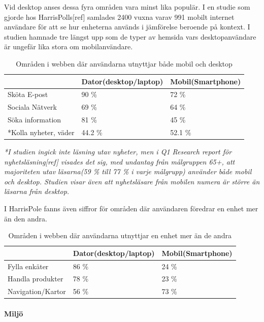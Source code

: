 \documentclass[11pt]{article}
\begin{document}
Vid desktop anses dessa fyra områden vara minst lika populär. I en studie som gjorde hos HarrisPolls[ref] samlades 2400 vuxna varav 991 mobilt internet användare för att se hur enheterna används i jämförelse beroende på kontext. I studien hamnade tre längst upp som de typer av hemsida vars desktopanvändare är ungefär lika stora om mobilanvändare.
\\
\begin{table}[H]
	\centering
	\begin{tabular}{|p{4cm}|p{4cm}|p{4cm}|}
	\hline
	~&Dator(desktop/laptop)&Mobil(Smartphone)\\ \hline
	Sköta E-post &90 \%&72 \%\\ \hline
	Sociala Nätverk&69 \%&64 \%\\ \hline
	Söka information&81 \%&45 \%\\ \hline
	*Kolla nyheter, väder&44.2 \%&52.1 \%\\ \hline
	\end{tabular}
    \caption {Områden i webben där användarna utnyttjar både mobil och desktop}
\end{table}
\textit{*I studien ingick inte läsning utav nyheter, men i Q1 Research report för nyhetsläsning[ref] visades det sig, med undantag från målgruppen 65+, att majoriteten utav läsarna(59 \% till 77 \% i varje målgrupp) använder både mobil och desktop. Studien visar även att nyhetsläsare från mobilen numera är större än läsarna från desktop.}

I HarrisPole fanns även siffror för områden där användaren föredrar en enhet mer än den andra.

\begin{table}[H]
	\centering
	\begin{tabular}{|p{4cm}|p{4cm}|p{4cm}|}
	\hline
	~&Dator(desktop/laptop)&Mobil(Smartphone)\\ \hline
	Fylla enkäter &86 \%&24 \%\\ \hline
	Handla produkter&78 \%&23 \%\\ \hline
	Navigation/Kartor&56 \%&73 \%\\ \hline
	\end{tabular}
    \caption {Områden i webben där användarna utnyttjar en enhet mer än de andra}
\end{table}

\paragraph{Miljö} \mbox{} \\
\end{document}

